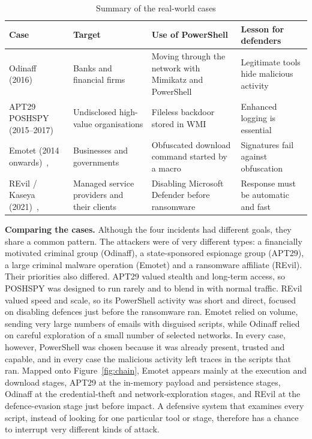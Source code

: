 \documentclass[12pt,a4paper]{article}
\newcommand{\head}[1]{\noindent\textbf{#1}\quad}
\begin{document}
\begin{table}[htbp]
\centering
\caption{Summary of the real-world cases}\label{tab:cases}
\begin{tabularx}{\textwidth}{>{\raggedright\arraybackslash}p{2.9cm} >{\raggedright\arraybackslash}p{2.6cm} >{\raggedright\arraybackslash}X >{\raggedright\arraybackslash}X}
\toprule
\textbf{Case} & \textbf{Target} & \textbf{Use of PowerShell} & \textbf{Lesson for defenders}\\
\midrule
Odinaff (2016)~\cite{symantec2016odinaff} & Banks and financial firms & Moving through the network with Mimikatz and PowerShell & Legitimate tools hide malicious activity\\
APT29 POSHSPY (2015--2017)~\cite{dunwoody2017} & Undisclosed high-value organisations & Fileless backdoor stored in WMI & Enhanced logging is essential\\
Emotet (2014 onwards)~\cite{cisa2020emotet}, \cite{patsakis2024} & Businesses and governments & Obfuscated download command started by a macro & Signatures fail against obfuscation\\
REvil / Kaseya (2021)~\cite{sophos2021}, \cite{splunk2021} & Managed service providers and their clients & Disabling Microsoft Defender before ransomware & Response must be automatic and fast\\
\bottomrule
\end{tabularx}
\end{table}

\head{Comparing the cases.} Although the four incidents had different goals, they share a common pattern. The attackers were of very different types: a financially motivated criminal group (Odinaff), a state-sponsored espionage group (APT29), a large criminal malware operation (Emotet) and a ransomware affiliate (REvil). Their priorities also differed. APT29 valued stealth and long-term access, so POSHSPY was designed to run rarely and to blend in with normal traffic. REvil valued speed and scale, so its PowerShell activity was short and direct, focused on disabling defences just before the ransomware ran. Emotet relied on volume, sending very large numbers of emails with disguised scripts, while Odinaff relied on careful exploration of a small number of selected networks. In every case, however, PowerShell was chosen because it was already present, trusted and capable, and in every case the malicious activity left traces in the scripts that ran. Mapped onto Figure~\ref{fig:chain}, Emotet appears mainly at the execution and download stages, APT29 at the in-memory payload and persistence stages, Odinaff at the credential-theft and network-exploration stages, and REvil at the defence-evasion stage just before impact. A defensive system that examines every script, instead of looking for one particular tool or stage, therefore has a chance to interrupt very different kinds of attack.
\end{document}
